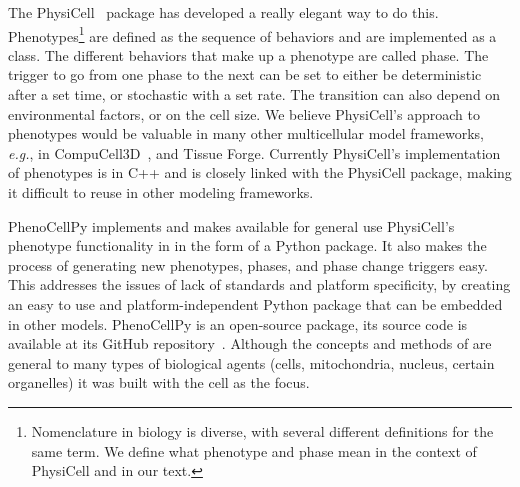 The PhysiCell~\cite{ghaffarizadeh_physicell_2018} package has developed a really elegant way to do this. Phenotypes\footnote{\label{foot:names-in-bio}Nomenclature in biology is diverse, with several different definitions for the same term. We define what phenotype and phase mean in the context of PhysiCell and \pcps in our text.} 
are defined as the sequence of behaviors and are implemented as a class. The different behaviors that make up a phenotype are called phase. The trigger to go from one phase to the next can be set to either be deterministic after a set time, or stochastic with a set rate. The transition can also depend on environmental factors, or on the cell size.
We believe PhysiCell's approach to phenotypes would be valuable in many other multicellular model frameworks, \textit{e.g.}, in CompuCell3D~\cite{swat_multi-scale_2012}, and Tissue Forge. Currently PhysiCell's implementation of phenotypes is in C++ and is closely linked with the PhysiCell package, making it difficult to reuse in other modeling frameworks. 



PhenoCellPy implements and makes available for general use PhysiCell's phenotype functionality in in the form of a Python package. It also makes the process of generating new phenotypes, phases, and phase change triggers easy. This
addresses the issues of lack of standards and platform specificity,  by creating an easy to use and platform-independent Python package 
that can be embedded in other models. PhenoCellPy is an open-source package, its source code is available at its GitHub repository~\cite{gianlupi_phenocellpy_2022}. Although the concepts and methods of \pcps are general to many types of biological agents (cells, mitochondria, nucleus, certain organelles) it was built with the cell as the focus.


